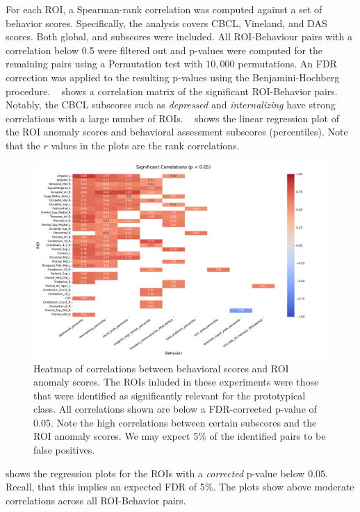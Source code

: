 For each ROI, a Spearman-rank correlation was computed against a set of behavior scores. Specifically, the analysis covers CBCL, Vineland, and DAS scores. Both global, and subscores were included. All ROI-Behaviour pairs with a correlation below 0.5 were filtered out and p-values were computed for the remaining pairs using a Permutation test with $10,000$ permutations. An FDR correction was applied to the resulting p-values using the Benjamini-Hochberg procedure. ~ shows a correlation matrix of the significant ROI-Behavior pairs. Notably, the CBCL subscores such as \textit{depressed} and \textit{internalizing} have strong correlations with a large number of ROIs. ~ shows the linear regression plot of the ROI anomaly scores and behavioral assessment subscores (percentiles). Note that the $r$ values in the plots are the rank correlations.

\begin{figure}[tbhp]
\centering
\includegraphics[width=\linewidth]{figures/sig_roi_corrs.pdf}
\caption{Heatmap of correlations between behavioral scores and ROI anomaly scores. The ROIs inluded in these experiments were those that were identified as significantly relevant for the prototypical class. All correlations shown are below a FDR-corrected p-value of $0.05$. Note the high correlations between certain subscores and the ROI anomaly scores. We may expect 5\% of the identified pairs to be false positives.}
\label{fig:roi-corr}
\end{figure}

 shows the regression plots for the ROIs with a \textit{corrected} p-value below $0.05$. Recall, that this implies an expected FDR of 5\%. The plots show above moderate correlations across all ROI-Behavior pairs.

